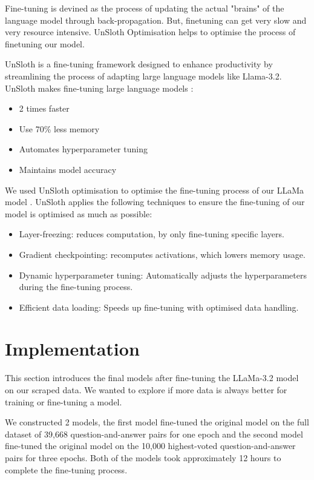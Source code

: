\documentclass[10pt]{article}
\begin{document}
Fine-tuning is devined as the process of updating the actual "brains" of the language model
through back-propagation. But, finetuning can get very slow and very resource intensive.
UnSloth Optimisation helps to optimise the process of finetuning our model.

UnSloth is a fine-tuning framework designed to enhance productivity by streamlining the
process of adapting large language models like Llama-3.2. UnSloth makes fine-tuning
large language models \cite{unslothdocs}:
\begin{itemize}
    \item 2 times faster
    \item Use 70\% less memory
    \item Automates hyperparameter tuning
    \item Maintains model accuracy
\end{itemize}

We used UnSloth optimisation to optimise the fine-tuning process of our LLaMa model \cite{unslothfine-tune}.
UnSloth applies the following techniques to ensure the fine-tuning
of our model is optimised as much as possible:
\begin{itemize}
    \item Layer-freezing: reduces computation, by only fine-tuning specific layers.
    \item Gradient checkpointing: recomputes activations, which lowers memory usage.
    \item Dynamic hyperparameter tuning: Automatically adjusts the hyperparameters during the fine-tuning process.
    \item Efficient data loading: Speeds up fine-tuning with optimised data handling.
\end{itemize}

\section{Implementation}

This section introduces the final models after fine-tuning the LLaMa-3.2 model on our scraped data.
We wanted to explore if more data is always better for training or fine-tuning a model.

We constructed 2 models, the first model fine-tuned the original model on the full dataset of
39,668 question-and-answer pairs for one epoch and the second model fine-tuned the original model
on the 10,000 highest-voted question-and-answer pairs for three epochs. Both of the models took
approximately 12 hours to complete the fine-tuning process.
\end{document}
